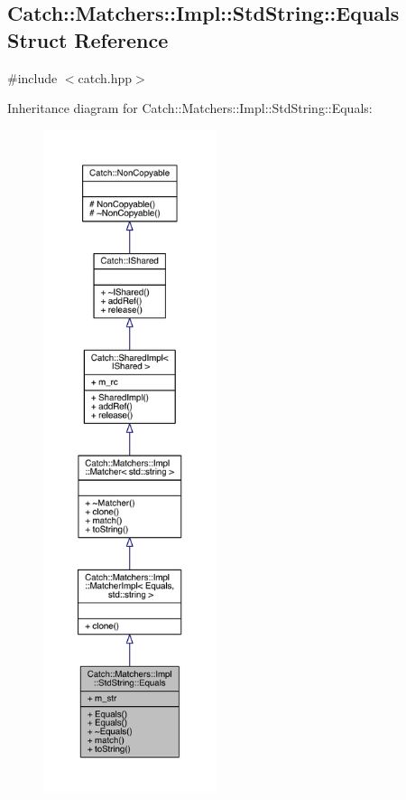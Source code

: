 \hypertarget{a00017}{}\subsection{Catch\+:\+:Matchers\+:\+:Impl\+:\+:Std\+String\+:\+:Equals Struct Reference}
\label{a00017}


{\ttfamily \#include $<$catch.\+hpp$>$}



Inheritance diagram for Catch\+:\+:Matchers\+:\+:Impl\+:\+:Std\+String\+:\+:Equals\+:\nopagebreak
\begin{figure}[H]
\begin{center}
\leavevmode
\includegraphics[height=550pt]{a00354}
\end{center}
\end{figure}


